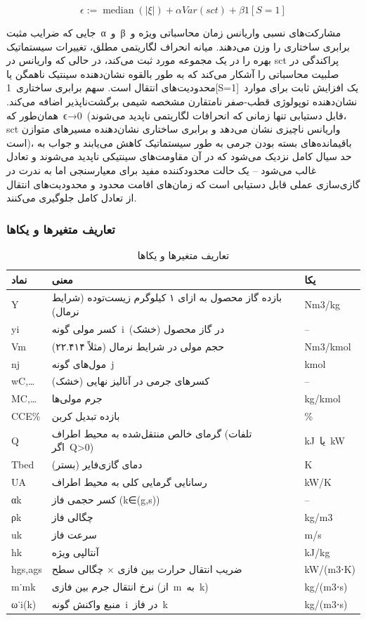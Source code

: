 \documentclass[12pt, a4paper]{article}
\begin{document}
\begin{equation}
\epsilon:=\operatorname{median}(|ξ|)+αVar(sct)+β1[S=1]\tag{19}
\end{equation}

جایی که ضرایب مثبت α و β مشارکت‌های نسبی واریانس زمان محاسباتی ویژه و برابری ساختاری را وزن می‌دهند. میانه انحراف لگاریتمی مطلق، تغییرات سیستماتیک بهره را در یک مجموعه مورد ثبت می‌کند، در حالی که واریانس در sct پراکندگی در صلبیت محاسباتی را آشکار می‌کند که به طور بالقوه نشان‌دهنده سینتیک ناهمگن یا محدودیت‌های انتقال است. سهم برابری ساختاری 1[S=1] یک افزایش ثابت برای موارد نشان‌دهنده توپولوژی قطب-صفر نامتقارن مشخصه شیمی برگشت‌ناپذیر اضافه می‌کند. همان‌طور که ϵ→0 (قابل دستیابی تنها زمانی که انحرافات لگاریتمی ناپدید می‌شوند، sct واریانس ناچیزی نشان می‌دهد و برابری ساختاری نشان‌دهنده مسیرهای متوازن است)، باقیمانده‌های بسته بودن جرمی به طور سیستماتیک کاهش می‌یابند و جواب به حد سیال کامل نزدیک می‌شود که در آن مقاومت‌های سینتیکی ناپدید می‌شوند و تعادل غالب می‌شود – یک حالت محدودکننده مفید برای معیارسنجی اما به ندرت در گازی‌سازی عملی قابل دستیابی است که زمان‌های اقامت محدود و محدودیت‌های انتقال از تعادل کامل جلوگیری می‌کنند.

\subsubsection{تعاریف متغیرها و یکاها}

\begin{table}[t]
\centering
\small
\caption{تعاریف متغیرها و یکاها}
\begin{tabularx}{\linewidth}{@{}*{3}{>{\raggedleft\arraybackslash}X}@{}}
\toprule
نماد & معنی & یکا \\
\midrule
Y & بازده گاز محصول به ازای ۱ کیلوگرم زیست‌توده (شرایط نرمال) & Nm3/kg \\
yi & کسر مولی گونه i در گاز محصول (خشک) & – \\
Vm & حجم مولی در شرایط نرمال (مثلاً ۲۲.۴۱۴) & Nm3/kmol \\
nj & مول‌های گونه j & kmol \\
wC,… & کسرهای جرمی در آنالیز نهایی (خشک) & – \\
MC,… & جرم مولی‌ها & kg/kmol \\
CCE\% & بازده تبدیل کربن & \% \\
Q & گرمای خالص منتقل‌شده به محیط اطراف (تلفات اگر Q>0) & kJ یا kW \\
Tbed & دمای گازی‌فایر (بستر) & K \\
UA & رسانایی گرمایی کلی به محیط اطراف & kW/K \\
αk & کسر حجمی فاز (k∈(g,s)) & – \\
ρk & چگالی فاز & kg/m3 \\
uk & سرعت فاز & m/s \\
hk & آنتالپی ویژه & kJ/kg \\
hgs,ags & ضریب انتقال حرارت بین فازی × چگالی سطح & kW/(m3⋅K) \\
m˙mk & نرخ انتقال جرم بین فازی (از m به k) & kg/(m3⋅s) \\
ω˙i(k) & منبع واکنش گونه i در فاز k & kg/(m3⋅s) \\
\bottomrule
\end{tabularx}
\end{table}
\end{document}
